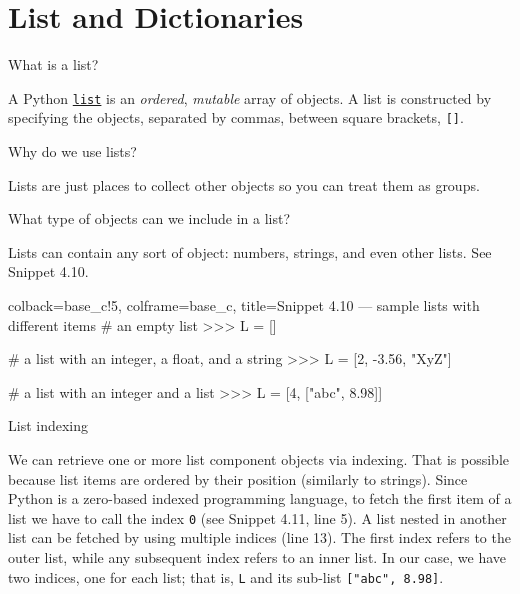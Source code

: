 \documentclass[a4paper,11pt]{book}
\numberwithin{figure}{chapter}
\numberwithin{table}{chapter}
\newcommand{\question}[1]{%
    \begin{tcolorbox}[colback=comp_c!10,colframe=comp_c,sidebyside align=top,width=\linewidth,before skip=1ex]
        #1
    \end{tcolorbox}
    \switchcolumn%
}
\newcommand{\note}[1]{%
    \begin{tcolorbox}[colback=white!0,colframe=white!10,width=\linewidth,before skip=1ex]
        #1
    \end{tcolorbox}
}
\begin{document}
\section{List and Dictionaries}

\begin{paracol}{2}
	\question{\raggedright What is a list?}
		\note{A Python \href{https://docs.python.org/3/tutorial/datastructures.html}{\texttt{list}} is an \emph{ordered}, \emph{mutable} array of objects. A list is constructed by specifying the objects, separated by commas, between square brackets, \texttt{[]}.}
\end{paracol}

\begin{paracol}{2}
	\question{\raggedright Why do we use lists?}
	\note{Lists are just places to collect other objects so you can treat them as groups.}
\end{paracol}

\begin{paracol}{2}
	\question{\raggedright What type of objects can we include in a list?}
	\note{Lists can contain any sort of object: numbers, strings, and even other lists. See Snippet 4.10.}
\end{paracol}
\clearpage

\begin{pythoncode}[linenos=true,]{colback=base_c!5, colframe=base_c, title=\sffamily Snippet 4.10 --- sample lists with different items}
# an empty list
>>> L = [] 

# a list with an integer, a float, and a string
>>> L = [2, -3.56, "XyZ"]

# a list with an integer and a list
>>> L = [4, ["abc", 8.98]]

\end{pythoncode}

\begin{paracol}{2}
	\question{\raggedright List indexing}
	\note{We can retrieve one or more list component objects via indexing. That is possible because list items are ordered by their position  (similarly to strings). Since Python is a zero-based indexed programming language, to fetch the first item of a list we have to call the index \texttt{0} (see Snippet 4.11, line 5). A list nested in another list can be fetched by using multiple indices (line 13). The first index refers to the outer list, while any subsequent index refers to an inner list. In our case, we have two indices, one for each list; that is, \texttt{L} and its sub-list \texttt{["abc", 8.98]}.}
\end{paracol}
\end{document}
